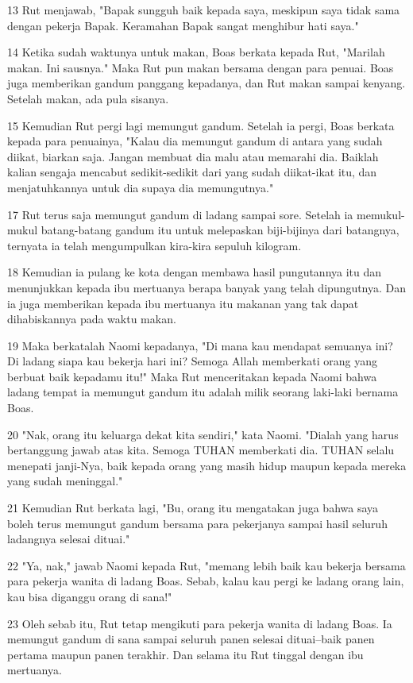 \par 13 Rut menjawab, "Bapak sungguh baik kepada saya, meskipun saya tidak sama dengan pekerja Bapak. Keramahan Bapak sangat menghibur hati saya."
\par 14 Ketika sudah waktunya untuk makan, Boas berkata kepada Rut, "Marilah makan. Ini sausnya." Maka Rut pun makan bersama dengan para penuai. Boas juga memberikan gandum panggang kepadanya, dan Rut makan sampai kenyang. Setelah makan, ada pula sisanya.
\par 15 Kemudian Rut pergi lagi memungut gandum. Setelah ia pergi, Boas berkata kepada para penuainya, "Kalau dia memungut gandum di antara yang sudah diikat, biarkan saja. Jangan membuat dia malu atau memarahi dia. Baiklah kalian sengaja mencabut sedikit-sedikit dari yang sudah diikat-ikat itu, dan menjatuhkannya untuk dia supaya dia memungutnya."
\par 17 Rut terus saja memungut gandum di ladang sampai sore. Setelah ia memukul-mukul batang-batang gandum itu untuk melepaskan biji-bijinya dari batangnya, ternyata ia telah mengumpulkan kira-kira sepuluh kilogram.
\par 18 Kemudian ia pulang ke kota dengan membawa hasil pungutannya itu dan menunjukkan kepada ibu mertuanya berapa banyak yang telah dipungutnya. Dan ia juga memberikan kepada ibu mertuanya itu makanan yang tak dapat dihabiskannya pada waktu makan.
\par 19 Maka berkatalah Naomi kepadanya, "Di mana kau mendapat semuanya ini? Di ladang siapa kau bekerja hari ini? Semoga Allah memberkati orang yang berbuat baik kepadamu itu!" Maka Rut menceritakan kepada Naomi bahwa ladang tempat ia memungut gandum itu adalah milik seorang laki-laki bernama Boas.
\par 20 "Nak, orang itu keluarga dekat kita sendiri," kata Naomi. "Dialah yang harus bertanggung jawab atas kita. Semoga TUHAN memberkati dia. TUHAN selalu menepati janji-Nya, baik kepada orang yang masih hidup maupun kepada mereka yang sudah meninggal."
\par 21 Kemudian Rut berkata lagi, "Bu, orang itu mengatakan juga bahwa saya boleh terus memungut gandum bersama para pekerjanya sampai hasil seluruh ladangnya selesai dituai."
\par 22 "Ya, nak," jawab Naomi kepada Rut, "memang lebih baik kau bekerja bersama para pekerja wanita di ladang Boas. Sebab, kalau kau pergi ke ladang orang lain, kau bisa diganggu orang di sana!"
\par 23 Oleh sebab itu, Rut tetap mengikuti para pekerja wanita di ladang Boas. Ia memungut gandum di sana sampai seluruh panen selesai dituai--baik panen pertama maupun panen terakhir. Dan selama itu Rut tinggal dengan ibu mertuanya.

